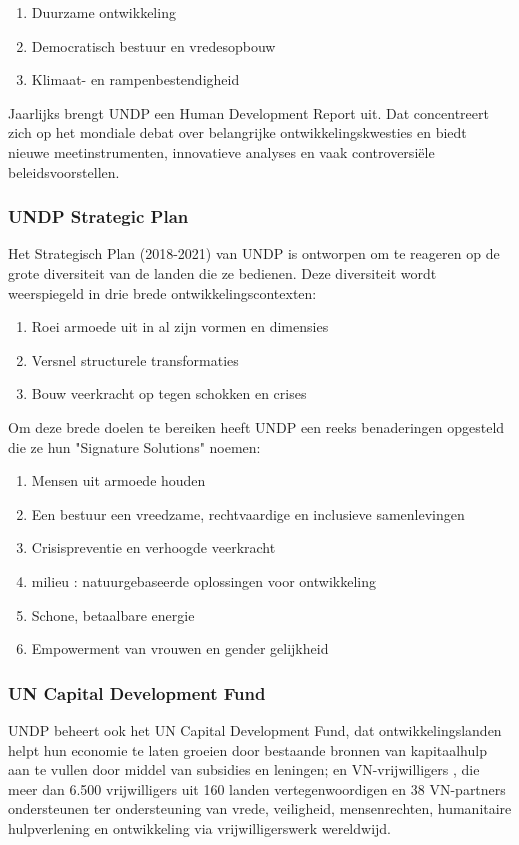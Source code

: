 \begin{enumerate}
\item Duurzame ontwikkeling
\item Democratisch bestuur en vredesopbouw
\item Klimaat- en rampenbestendigheid
\end{enumerate}

 Jaarlijks brengt UNDP een Human Development Report uit. Dat concentreert zich op het mondiale debat over belangrijke ontwikkelingskwesties en biedt nieuwe meetinstrumenten, innovatieve analyses en vaak controversiële beleidsvoorstellen. 

\subsubsection{UNDP Strategic Plan}
Het Strategisch Plan (2018-2021) van UNDP is ontworpen om te reageren op de grote diversiteit van de landen die ze bedienen. Deze diversiteit wordt weerspiegeld in drie brede ontwikkelingscontexten: \autocite{DevelopmentProgram2020}

\begin{enumerate}
\item Roei armoede uit in al zijn vormen en dimensies
\item Versnel structurele transformaties
\item Bouw veerkracht op tegen schokken en crises
\end{enumerate}

Om deze brede doelen te bereiken heeft UNDP een reeks benaderingen opgesteld die ze hun "Signature Solutions" noemen:

\begin{enumerate}
	\item Mensen uit armoede houden
	\item Een bestuur een vreedzame, rechtvaardige en inclusieve samenlevingen
	\item Crisispreventie en verhoogde veerkracht
	\item milieu : natuurgebaseerde oplossingen voor ontwikkeling
	\item Schone, betaalbare energie
	\item Empowerment van vrouwen en gender gelijkheid
\end{enumerate}

\subsubsection{UN Capital Development Fund}
UNDP beheert ook het UN Capital Development Fund, dat ontwikkelingslanden helpt hun economie te laten groeien door bestaande bronnen van kapitaalhulp aan te vullen door middel van subsidies en leningen; en VN-vrijwilligers , die meer dan 6.500 vrijwilligers uit 160 landen vertegenwoordigen en 38 VN-partners ondersteunen ter ondersteuning van vrede, veiligheid, mensenrechten, humanitaire hulpverlening en ontwikkeling via vrijwilligerswerk wereldwijd.

